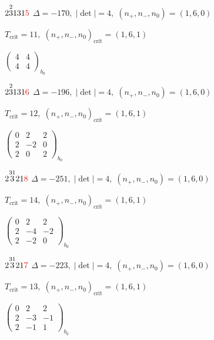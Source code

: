 \documentclass[10pt]{article}
\begin{document}
\smallskip

$2\overset{2}{3}131\textcolor{red}{5}$ \quad $\Delta=-170,\; |\det|=4,\; (n_+,n_-,n_0)=(1,6,0)$

\hspace{1em}$T_{\text{crit}}=11,\; (n_+,n_-,n_0)_{\text{crit}}=(1,6,1)$

\hspace{2em}$\left(\begin{smallmatrix}4 & 4 \\ 4 & 4\end{smallmatrix}\right)_{\!b_0}$

$2\overset{2}{3}131\textcolor{red}{6}$ \quad $\Delta=-196,\; |\det|=4,\; (n_+,n_-,n_0)=(1,6,0)$

\hspace{1em}$T_{\text{crit}}=12,\; (n_+,n_-,n_0)_{\text{crit}}=(1,6,1)$

\hspace{2em}$\left(\begin{smallmatrix}0 & 2 & 2 \\ 2 & -2 & 0 \\ 2 & 0 & 2\end{smallmatrix}\right)_{\!b_0}$

\smallskip

$2\overset{31}{3}21\textcolor{red}{8}$ \quad $\Delta=-251,\; |\det|=4,\; (n_+,n_-,n_0)=(1,6,0)$

\hspace{1em}$T_{\text{crit}}=14,\; (n_+,n_-,n_0)_{\text{crit}}=(1,6,1)$

\hspace{2em}$\left(\begin{smallmatrix}0 & 2 & 2 \\ 2 & -4 & -2 \\ 2 & -2 & 0\end{smallmatrix}\right)_{\!b_0}$

$2\overset{31}{3}21\textcolor{red}{7}$ \quad $\Delta=-223,\; |\det|=4,\; (n_+,n_-,n_0)=(1,6,0)$

\hspace{1em}$T_{\text{crit}}=13,\; (n_+,n_-,n_0)_{\text{crit}}=(1,6,1)$

\hspace{2em}$\left(\begin{smallmatrix}0 & 2 & 2 \\ 2 & -3 & -1 \\ 2 & -1 & 1\end{smallmatrix}\right)_{\!b_0}$
\end{document}
